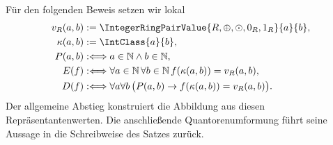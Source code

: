 \documentclass[main.tex]{subfiles}
\begin{document}
Für den folgenden Beweis setzen wir lokal
\[
  \begin{aligned}
    v_R(a,b)&:=\IntegerRingPairValue{R,\oplus,\odot,0_R,1_R}{a}{b},\\
    \kappa(a,b)&:=\IntClass{a}{b},\\
    P(a,b)&:\Longleftrightarrow a\in\mathbb N\land b\in\mathbb N,\\
    E(f)&:\Longleftrightarrow
      \forall a\in\mathbb N\,\forall b\in\mathbb N\,
        f(\kappa(a,b))=v_R(a,b),\\
    D(f)&:\Longleftrightarrow
      \forall a\forall b\,
        \bigl(P(a,b)\rightarrow f(\kappa(a,b))=v_R(a,b)\bigr).
  \end{aligned}
\]
Der allgemeine Abstieg konstruiert die Abbildung aus diesen
Repräsentantenwerten. Die anschließende Quantorenumformung führt seine
Aussage in die Schreibweise des Satzes zurück.
\end{document}
